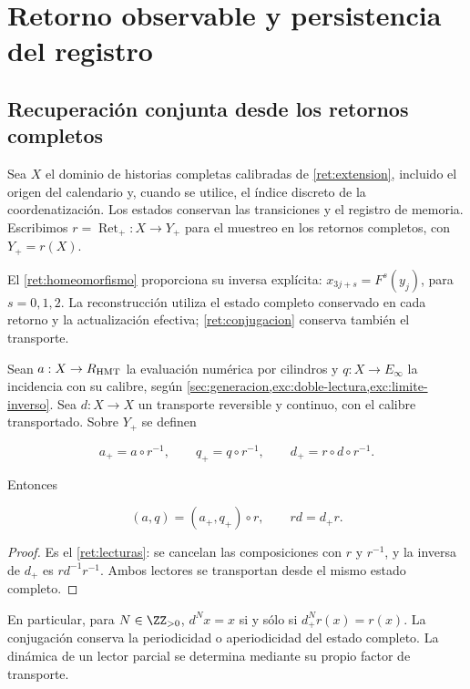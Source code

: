\section{Retorno observable y persistencia del registro}
\label{nuclear:9}
\subsection{Recuperación conjunta desde los retornos completos}

Sea \(X\) el dominio de historias completas calibradas de
\cref{ret:extension}, incluido el origen del calendario y, cuando se
utilice, el índice discreto de la coordenatización. Los estados conservan las
transiciones y el registro de memoria. Escribimos
\(r=\operatorname{Ret}_+:X\to Y_+\) para el muestreo en los retornos
completos, con \(Y_+=r(X)\).

El \cref{ret:homeomorfismo} proporciona su inversa explícita:
\(x_{3j+s}=F^s(y_j)\), para \(s=0,1,2\). La reconstrucción utiliza
el estado completo conservado en cada retorno y la actualización
efectiva; \eqref{ret:conjugacion} conserva también el transporte.

Sean \(a:X\to R_{\rm HMT}\) la evaluación numérica por cilindros y
\(q:X\to E_\infty\) la incidencia con su calibre, según
\cref{sec:generacion,exc:doble-lectura,exc:limite-inverso}.
Sea \(d:X\to X\) un transporte reversible y continuo, con el calibre
transportado. Sobre \(Y_+\) se definen



\[
a_+=a\circ r^{-1},\qquad q_+=q\circ r^{-1},\qquad d_+=r\circ d\circ r^{-1}.
\]



Entonces



\begin{equation}
\boxed{(a,q)=(a_+,q_+)\circ r,\qquad rd=d_+r.}
\label{nuc09:lecturas}
\end{equation}



\begin{proof}
Es el \cref{ret:lecturas}: se cancelan las composiciones con \(r\)
y \(r^{-1}\), y la inversa de \(d_+\) es \(rd^{-1}r^{-1}\).
Ambos lectores se transportan desde el mismo estado completo.
\end{proof}

En particular, para \(N\in\ZZ_{>0}\),
\(d^Nx=x\) si y sólo si \(d_+^Nr(x)=r(x)\).
La conjugación conserva la periodicidad o aperiodicidad del estado
completo. La dinámica de un lector parcial se determina mediante
su propio factor de transporte.

